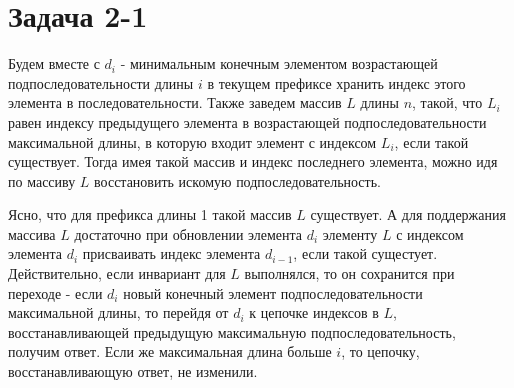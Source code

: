 \documentclass{article}
\begin{document}
\section{Задача 2-1}

Будем вместе с $d_i$ - минимальным конечным элементом возрастающей подпоследовательности длины $i$ в текущем префиксе хранить индекс этого элемента в последовательности. Также заведем массив $L$ длины $n$, такой, что $L_i$ равен индексу предыдущего элемента в возрастающей подпоследовательности максимальной длины, в которую входит элемент с индексом $L_i$, если такой существует. Тогда имея такой массив и индекс последнего элемента, можно идя по массиву $L$ восстановить искомую подпоследовательность.

Ясно, что для префикса длины 1 такой массив $L$ существует. А для поддержания массива $L$ достаточно при обновлении элемента $d_i$ элементу $L$ с индексом элемента $d_i$ присваивать индекс элемента $d_{i-1}$, если такой сущестует. Действительно, если инвариант для $L$ выполнялся, то он сохранится при переходе - если $d_i$ новый конечный элемент подпоследовательности максимальной длины, то перейдя от $d_i$ к цепочке индексов в $L$, восстанавливающей предыдущую максимальную подпоследовательность, получим ответ. Если же максимальная длина больше $i$, то цепочку, восстанавливающую ответ, не изменили.
\end{document}
